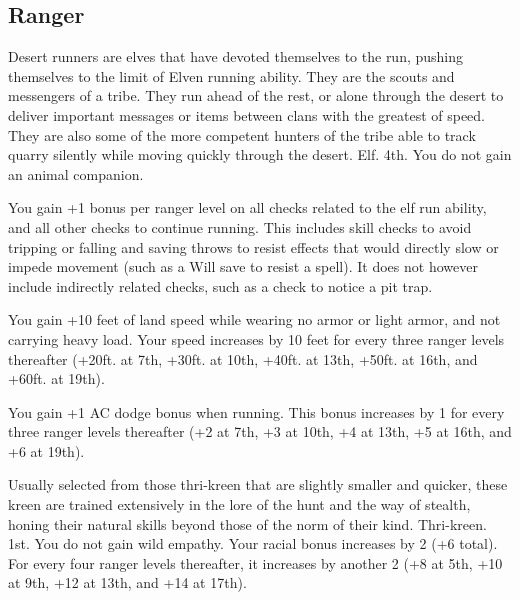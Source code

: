 \subsection{Ranger}
{Desert runners are elves that have devoted themselves to the run, pushing themselves to the limit of Elven running ability. They are the scouts and messengers of a tribe. They run ahead of the rest, or alone through the desert to deliver important messages or items between clans with the greatest of speed. They are also some of the more competent hunters of the tribe able to track quarry silently while moving quickly through the desert.}
{Elf.}
{4th.}
{You do not gain an animal companion.}
{
	You gain +1 bonus per ranger level on all  checks related to the elf run ability, and all other checks to continue running. This includes skill checks to avoid tripping or falling and saving throws to resist effects that would directly slow or impede movement (such as a Will save to resist a  spell). It does not however include indirectly related checks, such as a  check to notice a pit trap.

	You gain +10 feet of land speed while wearing no armor or light armor, and not carrying heavy load. Your speed increases by 10 feet for every three ranger levels thereafter (+20ft. at 7th, +30ft. at 10th, +40ft. at 13th, +50ft. at 16th, and +60ft. at 19th).

	You gain +1 AC dodge bonus when running. This bonus increases by 1 for every three ranger levels thereafter (+2 at 7th, +3 at 10th, +4 at 13th, +5 at 16th, and +6 at 19th).
}
{Usually selected from those thri-kreen that are slightly smaller and quicker, these kreen are trained extensively in the lore of the hunt and the way of stealth, honing their natural skills beyond those of the norm of their kind.}
{Thri-kreen.}
{1st.}
{You do not gain wild empathy.}
{
	Your racial  bonus increases by 2 (+6 total). For every four ranger levels thereafter, it increases by another 2 (+8 at 5th, +10 at 9th, +12 at 13th, and +14 at 17th).
}


